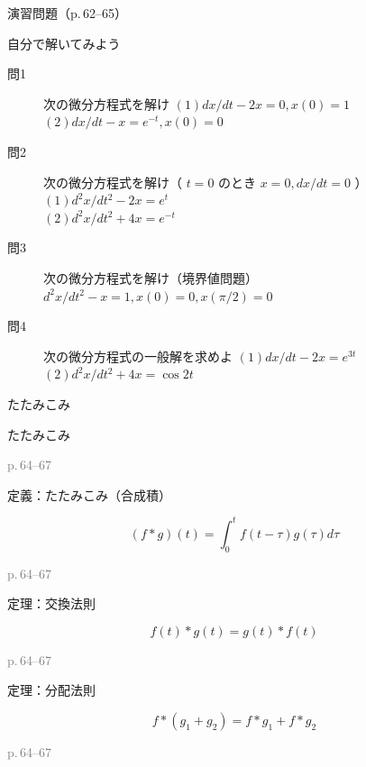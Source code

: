 \documentclass[aspectratio=43,professionalfonts,handout]{beamer}
\begin{document}
\begin{frame}{演習問題（p.\,62--65）}
  \begin{exampleblock}{自分で解いてみよう}
  \begin{description}
    \item[問1] 次の微分方程式を解け
    $(1) dx/dt - 2x = 0,  x(0) = 1$\\
    $(2) dx/dt - x = e^{-t},  x(0) = 0$\\
    \item[問2] 次の微分方程式を解け（ $t = 0$ のとき $x = 0, dx/dt = 0$ ）
    $(1) d^{2}x/dt^{2} - 2x = e^t$\\
    $(2) d^{2}x/dt^{2} + 4x = e^{-t}$\\
    \item[問3] 次の微分方程式を解け（境界値問題）
    $d^{2}x/dt^{2} - x = 1,  x(0) = 0,  x(\pi/2) = 0$\\
    \item[問4] 次の微分方程式の一般解を求めよ
    $(1) dx/dt - 2x = e^{3t}$\\
    $(2) d^{2}x/dt^{2} + 4x = \cos 2t$\\
  \end{description}
  \end{exampleblock}
\end{frame}

\begin{frame}{たたみこみ}
  \begin{block}{}
  {\large たたみこみ}
  \end{block}
  \vfill\hfill{\scriptsize \textcolor{gray}{p.\,64--67}}
\end{frame}

\begin{frame}{定義：たたみこみ（合成積）}
  \begin{block}{}
  \[
    (f * g)(t) = \int_{0}^t f(t-\tau)g(\tau) d\tau
  \]
  \end{block}
  \vfill\hfill{\scriptsize \textcolor{gray}{p.\,64--67}}
\end{frame}

\begin{frame}{定理：交換法則}
  \begin{block}{}
  \[
    f(t) * g(t) = g(t) * f(t)
  \]
  \end{block}
  \vfill\hfill{\scriptsize \textcolor{gray}{p.\,64--67}}
\end{frame}

\begin{frame}{定理：分配法則}
  \begin{block}{}
  \[
    f * (g_{1} + g_{2}) = f*g_{1} + f*g_{2}
  \]
  \end{block}
  \vfill\hfill{\scriptsize \textcolor{gray}{p.\,64--67}}
\end{frame}
\end{document}
